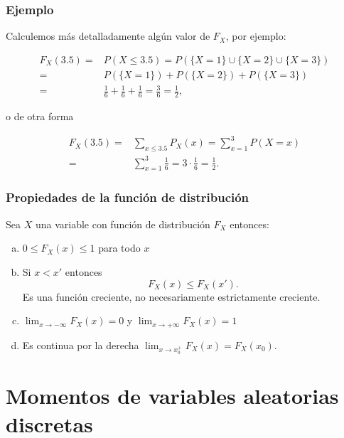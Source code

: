 \documentclass[handout]{beamer}\usepackage[]{graphicx}\usepackage[]{color}
\renewcommand{\leq}{\leqslant}
\theoremstyle{plain}
\theoremstyle{definition}
\begin{document}
\begin{frame}
\frametitle{Ejemplo}

Calculemos más detalladamente algún valor de $F_{X}$, por ejemplo:

\begin{equation*}
\begin{split}
F_{X}(3.5)= & P(X\leq 3.5)=  P(\{X=1\}\cup\{X=2\}\cup \{X=3\})\\
=& P(\{X=1\})+P(\{X=2\})+P(\{X=3\})\\=& 
\frac{1}{6}+\frac{1}{6}+\frac{1}{6}=\frac{3}{6}
=\frac{1}{2},
\end{split}
\end{equation*}


o de otra forma

  
\begin{equation*}
\begin{split}
F_{X}(3.5)=&\sum_{x\leq 3.5} P_X(x)=\sum_{x=1}^3 P(X=x)\\=&\sum_{x=1}^3 \frac{1}{6}= 3 \cdot
   \frac{1}{6}=\frac{1}{2}.
\end{split}
\end{equation*}

\end{frame}

\begin{frame}



\frametitle{Propiedades de la función de distribución}

Sea $X$ una variable con función de distribución $F_{X}$ entonces:
\begin{enumerate}[a)]
\item $0\leq F_{X}(x)\leq 1$ para todo $x$
\item Si $x<x'$ entonces $$F_{X}(x)\leq F_{X}(x').$$
Es una función creciente, no necesariamente estrictamente creciente.
\item $\displaystyle \lim_{x\to -\infty}F_{X}(x)=0$ y $\displaystyle \lim_{x\to +\infty}F_{X}(x)=1$
\item Es continua por la derecha $\displaystyle \lim_{x\to x_{0}^{+}}F_{X}(x)=F_{X}(x_{0})$.
\end{enumerate}
\end{frame}

\section{Momentos de variables aleatorias discretas}
\end{document}
